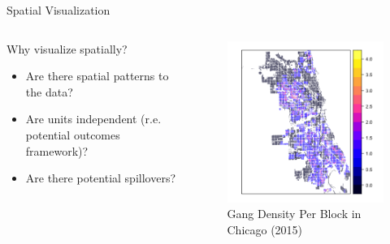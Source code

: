 \documentclass{beamer}
\begin{document}
\begin{frame}{Spatial Visualization}
\begin{columns}
\begin{column}{0.5\textwidth}
Why visualize spatially? 
\begin{itemize}
    \item Are there spatial patterns to the data?
    \item Are units independent (r.e. potential outcomes framework)? 
    \item Are there potential spillovers? 
\end{itemize}
\end{column}
\begin{column}{0.5\textwidth}
\begin{figure} 
\caption{Gang Density Per Block in Chicago (2015)}
\includegraphics[width = .9 \textwidth]{gang_density.png}
\end{figure} 
\end{column}
\end{columns} 

\end{frame}
\end{document}
